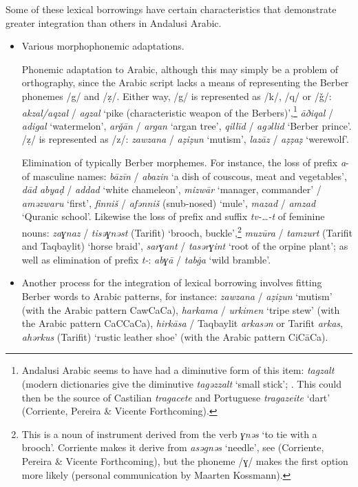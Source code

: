 \documentclass[output=paper,modfonts,nonflat]{langsci/langscibook}
\begin{document}
Some of these lexical borrowings have certain characteristics that demonstrate greater integration than others in Andalusi Arabic. 

\begin{itemize}
\item Various morphophonemic adaptations.


Phonemic adaptation to Arabic, although this may simply be a problem of orthography, since the Arabic script lacks a means of representing the Berber phonemes /g/ and /ẓ/. Either way, /g/ is represented as /k/, /q/ or /ǧ/: \textit{akzal/aqzal} / \textit{agzal} ‘pike (characteristic weapon of the Berbers)’,\footnote{Andalusi Arabic seems to have had a diminutive form of this item: \textit{tagzalt} (modern dictionaries give the diminutive \textit{tagǝzzalt} ‘small stick’; \citep{Taïfi1991}. This could then be the source of Castilian \textit{tragacete} and Portuguese \textit{tragazeite} ‘dart’ (Corriente, Pereira \& Vicente Forthcoming).}  \textit{āðiqal} / \textit{adigal} ‘watermelon’, \textit{arǧān} / \textit{argan} ‘argan tree’, \textit{qillīd} / \textit{agǝllid} ‘Berber prince’. /ẓ/ is represented as /z/: \textit{zawzana} / \textit{aẓiẓun} ‘mutism’, \textit{lazāz} / \textit{aẓẓaẓ} ‘werewolf’. 



Elimination of typically Berber morphemes. For instance, the loss of prefix \textit{a}{}- of masculine names: \textit{bāzīn} / \textit{abazin} ‘a dish of couscous, meat and vegetables’, \textit{dād} \textit{abyaḍ} / \textit{addad} ‘white chameleon’, \textit{mizwār} ‘manager, commander’ / \textit{amǝzwaru} ‘first’, \textit{finniš} / \textit{afǝnniš} (snub-nosed) ‘mule’, \textit{mazad} / \textit{amzad} ‘Quranic school’. Likewise the loss of prefix and suffix \textit{tv-…-t} of feminine nouns: \textit{zaɣnaz} / \textit{tisǝɣnǝst} (Tarifit) ‘brooch, buckle’,\footnote{This is a noun of instrument derived from the verb \textit{ɣnǝs} ‘to tie with a brooch’. Corriente makes it derive from \textit{asǝgnǝs} ‘needle’, see (Corriente, Pereira \& Vicente Forthcoming), but the phoneme /ɣ/ makes the first option more likely (personal communication by Maarten Kossmann).} \textit{muzūra} / \textit{tamzurt} (Tarifit and Taqbaylit) ‘horse braid’, \textit{sarɣant} / \textit{tasǝrɣint} ‘root of the orpine plant’; as well as elimination of prefix \textit{t-}: \textit{abɣā} / \textit{tab\.ga} ‘wild bramble’. 



\item Another process for the integration of lexical borrowing involves fitting Berber words to Arabic patterns, for instance: \textit{zawzana} / \textit{aẓiẓun} ‘mutism’ (with the Arabic pattern CawCaCa), \textit{harkama} / \textit{urkimen} ‘tripe stew’ (with the Arabic pattern CaCCaCa), \textit{hirkāsa} / Taqbaylit \textit{arkasǝn} or Tarifit \textit{arkas}, \textit{ahǝrkus} (Tarifit) ‘rustic leather shoe’ (with the Arabic pattern CiCāCa).
\end{itemize}
\end{document}
